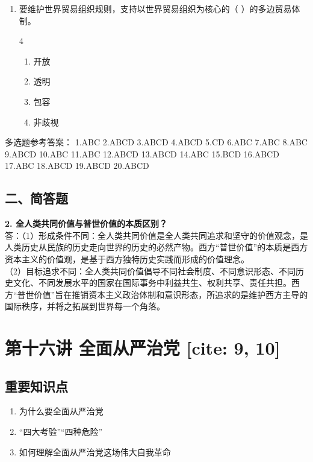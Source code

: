 \documentclass[a4paper,11pt]{ctexart}
\begin{document}
\begin{enumerate}
    \item 要维护世界贸易组织规则，支持以世界贸易组织为核心的（ ）的多边贸易体制。
    \begin{multicols}{4}
    \begin{enumerate}
        \item 开放
        \item 透明
        \item 包容
        \item 非歧视
    \end{enumerate}
    \end{multicols}
\end{enumerate}

\begin{answerbox}
多选题参考答案：
1.ABC \quad 2.ABCD \quad 3.ABCD \quad 4.ABCD \quad 5.CD \quad 6.ABC \quad 7.ABC \quad 8.ABC \quad 9.ABCD \quad 10.ABC \quad 11.ABC \quad 12.ABCD \quad 13.ABCD \quad 14.ABC \quad 15.BCD \quad 16.ABCD \quad 17.ABC \quad 18.ABCD \quad 19.ABCD \quad 20.ABCD
\end{answerbox}

\subsection{二、简答题}
\textbf{2. 全人类共同价值与普世价值的本质区别？} \\
答：（1）形成条件不同：全人类共同价值是全人类共同追求和坚守的价值观念，是人类历史从民族的历史走向世界的历史的必然产物。西方“普世价值”的本质是西方资本主义的价值观，是基于西方独特历史实践而形成的价值理念。 \\
（2）目标追求不同：全人类共同价值倡导不同社会制度、不同意识形态、不同历史文化、不同发展水平的国家在国际事务中利益共生、权利共享、责任共担。西方“普世价值”旨在推销资本主义政治体制和意识形态，所追求的是维护西方主导的国际秩序，并将之拓展到世界每一个角落。

\newpage

\section{第十六讲 全面从严治党 [cite: 9, 10]}

\subsection{重要知识点}
\begin{enumerate}
    \item 为什么要全面从严治党
    \item “四大考验”“四种危险”
    \item 如何理解全面从严治党这场伟大自我革命
\end{enumerate}
\end{document}
